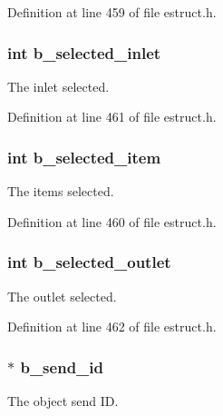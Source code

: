 Definition at line 459 of file estruct.\-h.

\hypertarget{struct__ebox_a0cebb4789c213079e0490e86c10c2893}{
\subsubsection[{b\-\_\-selected\-\_\-inlet}]{\setlength{\rightskip}{0pt plus 5cm}int b\-\_\-selected\-\_\-inlet}}\label{struct__ebox_a0cebb4789c213079e0490e86c10c2893}
The inlet selected. 

Definition at line 461 of file estruct.\-h.

\hypertarget{struct__ebox_a1f65b6d093e53fd85bed085ce0c5dd8e}{
\subsubsection[{b\-\_\-selected\-\_\-item}]{\setlength{\rightskip}{0pt plus 5cm}int b\-\_\-selected\-\_\-item}}\label{struct__ebox_a1f65b6d093e53fd85bed085ce0c5dd8e}
The items selected. 

Definition at line 460 of file estruct.\-h.

\hypertarget{struct__ebox_acbf0482cb9c6e192e2059775acc1ac86}{
\subsubsection[{b\-\_\-selected\-\_\-outlet}]{\setlength{\rightskip}{0pt plus 5cm}int b\-\_\-selected\-\_\-outlet}}\label{struct__ebox_acbf0482cb9c6e192e2059775acc1ac86}
The outlet selected. 

Definition at line 462 of file estruct.\-h.

\hypertarget{struct__ebox_ac59460230e622f821660b599e2f96ca9}{
\subsubsection[{b\-\_\-send\-\_\-id}]{$\ast$ b\-\_\-send\-\_\-id}}\label{struct__ebox_ac59460230e622f821660b599e2f96ca9}
The object send I\-D. 

